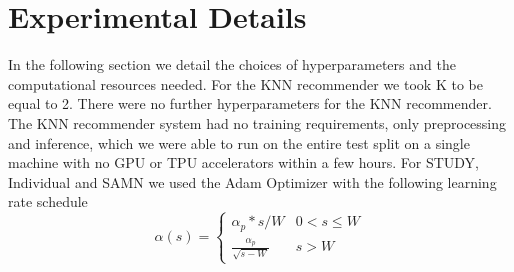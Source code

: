 \documentclass{article}
\begin{document}
\section{Experimental Details}
\label{section:app:experiment}
In the following section we detail the choices of hyperparameters and the computational resources needed.
For the KNN recommender we took K to be equal to 2. There were no further hyperparameters for the KNN recommender. The KNN recommender system had no training requirements, only preprocessing and inference, which we were able to run on the entire test split on a single machine with no GPU or TPU accelerators within a few hours.
For STUDY, Individual and SAMN we used the Adam Optimizer with the following learning rate schedule
\begin{equation*}
    \alpha (s) = \begin{cases}
        \alpha_p  * s / W & 0 < s \leq W \\
        \frac{\alpha_p}{\sqrt{s - W}} & s > W
   \end{cases}
\end{equation*}
\vfill
\end{document}

